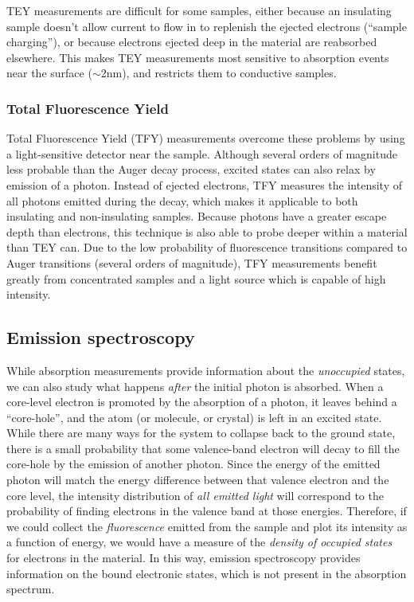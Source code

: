 TEY measurements are difficult for some samples, either because an insulating sample doesn't allow current to flow in to replenish the ejected electrons (``sample charging''), or because electrons ejected deep in the material are reabsorbed elsewhere.  This makes TEY measurements most sensitive to absorption events near the surface ($\sim$2nm), and restricts them to conductive samples.
\subsubsection{Total Fluorescence Yield}
Total Fluorescence Yield (TFY) measurements overcome these problems by using a light-sensitive detector near the sample.  Although several orders of magnitude less probable than the Auger decay process, excited states can also relax by emission of a photon.  Instead of ejected electrons, TFY measures the intensity of all photons emitted during the decay, which makes it applicable to both insulating and non-insulating samples.  Because photons have a greater escape depth than electrons, this technique is also able to probe deeper within a material than TEY can.  Due to the low probability of fluorescence transitions compared to Auger transitions (several orders of magnitude), TFY measurements benefit greatly from concentrated samples and a light source which is capable of high intensity.

\subsection{Emission spectroscopy}
While absorption measurements provide information about the \emph{unoccupied} states, we can also study what happens \emph{after} the initial photon is absorbed.  When a core-level electron is promoted by the absorption of a photon, it leaves behind a ``core-hole'', and the atom (or molecule, or crystal) is left in an excited state.  While there are many ways for the system to collapse back to the ground state, there is a small probability that some valence-band electron will decay to fill the core-hole by the emission of another photon.  Since the energy of the emitted photon will match the energy difference between that valence electron and the core level, the intensity distribution of \emph{all emitted light} will correspond to the probability of finding electrons in the valence band at those energies.  Therefore, if we could collect the \emph{fluorescence} emitted from the sample and plot its intensity as a function of energy, we would have a measure of the \emph{density of occupied states} for electrons in the material.  In this way, emission spectroscopy provides information on the bound electronic states, which is not present in the absorption spectrum.

